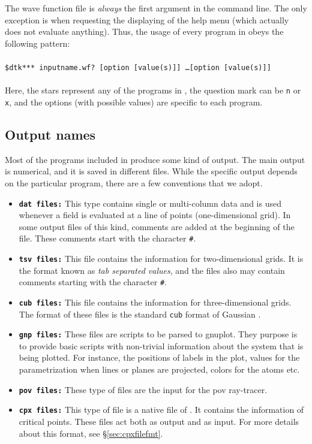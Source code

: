 The wave function file is \textit{always} the first argument in the command line. The only exception is when requesting the displaying of the help menu (which actually does not evaluate anything). Thus, the usage of every program in \DTK{} obeys the following pattern:\\\phantom{as}\\
\phantom{MMM}\texttt{\$dtk*** inputname.wf? [option [value(s)]] \dots [option [value(s)]]}\\
\phantom{a}\\
Here, the stars represent any of the programs in \DTK, the question mark can be \texttt{n} or \texttt{x}, and the options (with possible values) are specific to each program.

\subsection{Output names}

Most of the programs included in \DTK{} produce some kind of output. The main output is numerical, and it is saved in different files. While the specific output depends on the particular program, there are a few conventions that we adopt. 

\begin{itemize}
   \item \texttt{\textbf{dat files:}} This type contains single or multi-column data and is used whenever a field is evaluated at a line of points (one-dimensional grid). In some output files of this kind, comments are added at the beginning of the file. These comments start with the character \texttt{\#}.
   \item \texttt{\textbf{tsv files:}} This file contains the information for two-dimensional grids. It is the format known as \textit{tab separated values}, and the files also may contain comments starting with the character \texttt{\#}.
   \item \texttt{\textbf{cub files:}} This file contains the information for three-dimensional grids. The format of these files is the standard \texttt{cub} format of Gaussian \cite{bib:gaussian09}.
   \item \texttt{\textbf{gnp files:}} These files are scripts to be parsed to gnuplot. They purpose is to provide basic scripts with non-trivial information about the system that is being plotted. For instance, the positions of labels in the plot, values for the parametrization when lines or planes are projected, colors for the atoms etc.
   \item \texttt{\textbf{pov files:}} These type of files are the input for the pov ray-tracer.
   \item \texttt{\textbf{cpx files:}} This type of file is a native file of \DTK. It contains the information of critical points. These files act both as output and as input. For more details about this format, see \S\ref{sec:cpxfilefmt}.
\end{itemize}

